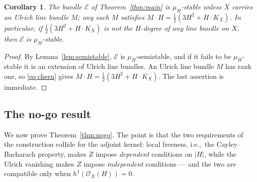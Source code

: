 \documentclass{amsart}
\newtheorem{corollary}[theorem]{Corollary}
\theoremstyle{definition}
\newcommand{\OO}{\mathcal{O}}
\newcommand{\EE}{\mathcal{E}}
\begin{document}
\begin{corollary}\label{cor:stable}
The bundle $\EE$ of Theorem~\ref{thm:main} is $\mu_H$-stable unless $X$ carries an Ulrich line bundle $M$; any such $M$ satisfies $M\cdot H=\tfrac12(3H^2+H\cdot K_X)$. In particular, if $\tfrac12(3H^2+H\cdot K_X)$ is not the $H$-degree of any line bundle on $X$, then $\EE$ is $\mu_H$-stable.
\end{corollary}

\begin{proof}
By Lemma~\ref{lem:semistable}, $\EE$ is $\mu_H$-semistable, and if it fails to be $\mu_H$-stable it is an extension of Ulrich line bundles. An Ulrich line bundle $M$ has rank one, so \eqref{eq:chern} gives $M\cdot H=\tfrac12(3H^2+H\cdot K_X)$. The last assertion is immediate.
\end{proof}

\subsection{The no-go result}\label{subsec:nogo}
We now prove Theorem~\ref{thm:nogo}. The point is that the two requirements of the construction collide for the adjoint kernel: local freeness, i.e.,\ the Cayley--Bacharach property, makes $Z$ impose \emph{dependent} conditions on $|H|$, while the Ulrich vanishing makes $Z$ impose \emph{independent} conditions --- and the two are compatible only when $h^1(\OO_X(H))=0$.
\end{document}
